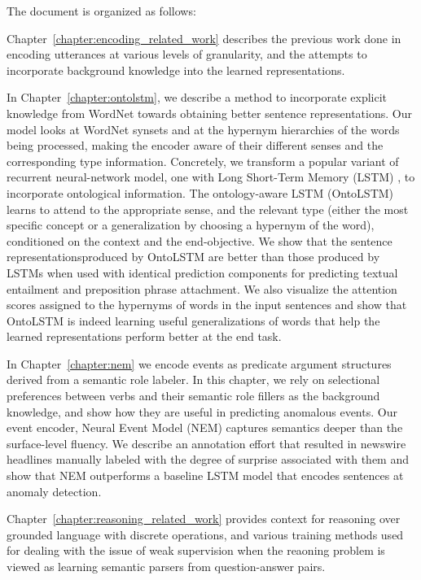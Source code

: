 The document is organized as follows:

Chapter~\ref{chapter:encoding_related_work} describes the previous work done in encoding utterances
at various levels of granularity, and the attempts to incorporate background knowledge into
the learned representations.

In Chapter~\ref{chapter:ontolstm}, we describe a method to incorporate explicit knowledge from
WordNet towards obtaining better sentence representations. Our model looks at WordNet synsets and at
the hypernym hierarchies of the words being processed, making the encoder aware of their different
senses and the corresponding type information. Concretely, we transform a popular variant of
recurrent neural-network model, one with Long Short-Term Memory (LSTM) \citep{hochreiter1997long},
to incorporate ontological information.  The ontology-aware LSTM (OntoLSTM) learns to attend to the
appropriate sense, and the relevant type (either the most specific concept or a generalization by
choosing a hypernym of the word), conditioned on the context and the end-objective. We show that the
sentence representationsproduced by OntoLSTM are better than those produced by LSTMs when used with
identical prediction components for predicting textual entailment and preposition phrase attachment.
We also visualize the attention scores assigned to the hypernyms of words in the input sentences and
show that OntoLSTM is indeed learning useful generalizations of words that help the learned
representations perform better at the end task.

In Chapter~\ref{chapter:nem} we encode events as predicate argument structures derived from a
semantic role labeler.  In this chapter, we rely on selectional preferences between verbs and their
semantic role fillers as the background knowledge, and show how they are useful in predicting
anomalous events.  Our event encoder, Neural Event Model (NEM) captures semantics deeper than the
surface-level fluency. We describe an annotation effort that resulted in newswire headlines manually
labeled with the degree of surprise associated with them and show that NEM outperforms a baseline
LSTM model that encodes sentences at anomaly detection. 

Chapter~\ref{chapter:reasoning_related_work} provides context for reasoning over grounded language
with discrete operations, and various training methods used for dealing with the issue of weak
supervision when the reaoning problem is viewed as learning semantic parsers from question-answer
pairs.

